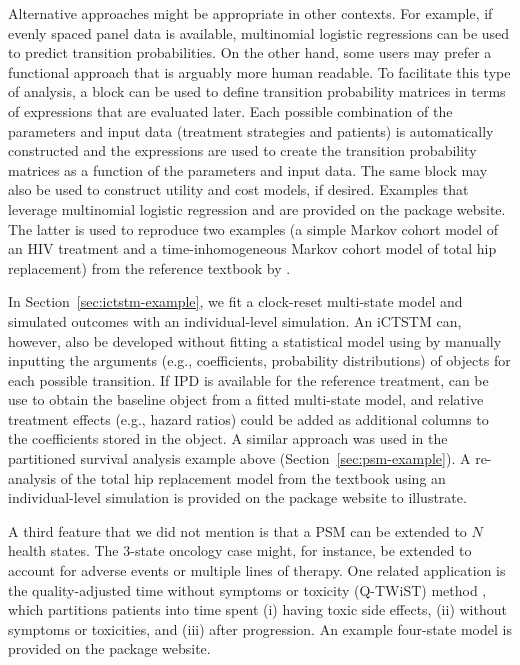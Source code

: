 \documentclass[article, nojss]{jss}\usepackage[]{graphicx}\usepackage[]{color}
\begin{document}
Alternative approaches might be appropriate in other contexts. For example, if evenly spaced panel data is available, multinomial logistic regressions can be used to predict transition probabilities. On the other hand, some users may prefer a functional approach that is arguably more human readable. To facilitate this type of analysis, a  block can be used to define transition probability matrices in terms of expressions that are evaluated later. Each possible combination of the parameters and input data (treatment strategies and patients) is automatically constructed and the expressions are used to create the transition probability matrices as a function of the parameters and input data. The same  block may also be used to construct utility and cost models, if desired. Examples that leverage multinomial logistic regression and  are provided on the package website. The latter is used to reproduce two examples (a simple Markov cohort model of an HIV treatment and a time-inhomogeneous Markov cohort model of total hip replacement) from the reference textbook by \citet{briggs2006decision}.

In Section~\ref{sec:ictstm-example}, we fit a clock-reset multi-state model and simulated outcomes with an individual-level simulation. An iCTSTM can, however, also be developed without fitting a statistical model using  by manually inputting the arguments (e.g., coefficients, probability distributions) of  objects for each possible transition. If IPD is available for the reference treatment,  can be use to obtain the baseline  object from a fitted multi-state model, and relative treatment effects (e.g., hazard ratios) could be added as additional columns to the coefficients stored in the  object. A similar approach was used in the partitioned survival analysis example above (Section~\ref{sec:psm-example}). A re-analysis of the total hip replacement model from the \citet{briggs2006decision} textbook using an individual-level simulation is provided on the package website to illustrate. 

A third feature that we did not mention is that a PSM can be extended to $N$ health states. The 3-state oncology case might, for instance, be extended to account for adverse events or multiple lines of therapy. One related application is the quality-adjusted time without symptoms or toxicity (Q-TWiST) method \citep{goldhirsch1989costs, lenderking1994eval}, which partitions patients into time spent (i) having toxic side effects, (ii) without symptoms or toxicities, and (iii) after progression. An example four-state model is provided on the package website. 
\end{document}
